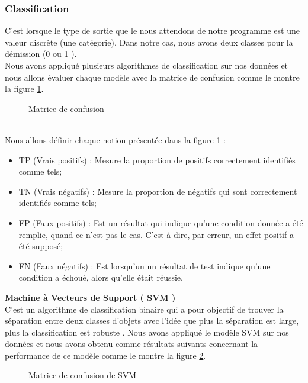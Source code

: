     \subsubsection{Classification}
    C’est lorsque le type de sortie que le nous attendons de notre programme est une valeur discrète (une catégorie). Dans notre cas, nous avons deux classes pour la démission (0 ou 1 ).\\
    Nous avons appliqué plusieurs algorithmes de classification sur nos données et nous allons évaluer chaque modèle avec la matrice de confusion comme le montre la figure \ref{fig:ConfusionMatrix}.
     \begin{figure}[htpb]
    \centering
    \caption{Matrice de confusion}
    \label{fig:ConfusionMatrix}
    \end{figure}
    \\
    Nous allons définir chaque notion présentée dans la figure \ref{fig:ConfusionMatrix} :
    \begin{itemize}
        \item TP (Vrais positifs) : Mesure la proportion de positifs correctement identifiés comme tels;
        \item TN (Vrais négatifs) : Mesure la proportion de négatifs qui sont correctement identifiés comme tels;
        \item FP (Faux positifs) : Est un résultat qui indique qu’une condition donnée a été remplie, quand ce n’est pas le cas. C’est à dire, par erreur, un effet positif a été supposé;
        \item FN (Faux négatifs) : Est lorsqu'un un résultat de test indique qu’une condition a échoué, alors qu’elle était réussie.

 \end{itemize}
\textbf{Machine à Vecteurs de Support ( SVM )} \\
C'est un algorithme de classification binaire qui a pour objectif de trouver la séparation entre deux classes d’objets avec l’idée que plus la séparation est large, plus la classification est robuste  \cite{SVM}.
   Nous avons appliqué le modèle SVM sur nos données et nous avons obtenu comme résultats suivants concernant la performance de ce modèle comme le montre la figure \ref{fig:confusionMatrixSVM}.
     \begin{figure}[htpb]
    \centering
    \caption{Matrice de confusion de SVM}
    \label{fig:confusionMatrixSVM}
    \end{figure}
